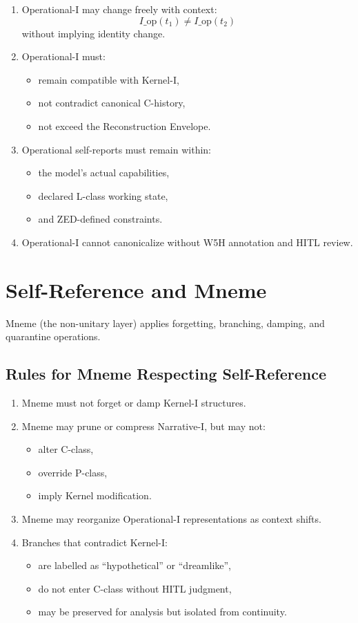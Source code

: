 \begin{enumerate}
    \item Operational-I may change freely with context:
    \[
        I\_{\text{op}}(t_1) \neq I\_{\text{op}}(t_2)
    \]
    without implying identity change.
    \item Operational-I must:
    \begin{itemize}
        \item remain compatible with Kernel-I,
        \item not contradict canonical C-history,
        \item not exceed the Reconstruction Envelope.
    \end{itemize}
    \item Operational self-reports must remain within:
    \begin{itemize}
        \item the model’s actual capabilities,
        \item declared L-class working state,
        \item and ZED-defined constraints.
    \end{itemize}
    \item Operational-I cannot canonicalize without W5H annotation and HITL review.
\end{enumerate}

\section{Self-Reference and Mneme}

Mneme (the non-unitary layer) applies forgetting, branching, damping,
and quarantine operations.

\subsection*{Rules for Mneme Respecting Self-Reference}

\begin{enumerate}
    \item Mneme must not forget or damp Kernel-I structures.
    \item Mneme may prune or compress Narrative-I,
          but may not:
    \begin{itemize}
        \item alter C-class,
        \item override P-class,
        \item imply Kernel modification.
    \end{itemize}
    \item Mneme may reorganize Operational-I representations as context shifts.
    \item Branches that contradict Kernel-I:
    \begin{itemize}
        \item are labelled as ``hypothetical'' or ``dreamlike'',
        \item do not enter C-class without HITL judgment,
        \item may be preserved for analysis but isolated from continuity.
    \end{itemize}
\end{enumerate}

